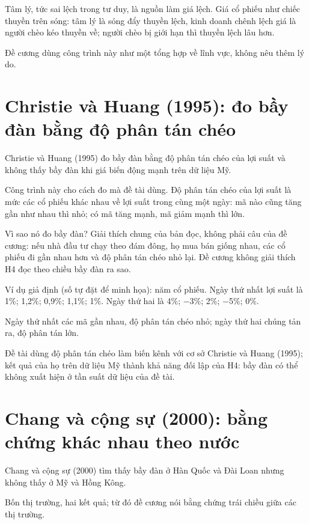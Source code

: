 Tâm lý, tức sai lệch trong tư duy, là nguồn làm giá lệch. Giá cổ phiếu như chiếc thuyền trên sóng: tâm lý là sóng đẩy thuyền lệch, kinh doanh chênh lệch giá là người chèo kéo thuyền về; người chèo bị giới hạn thì thuyền lệch lâu hơn.

Đề cương dùng công trình này như một tổng hợp về lĩnh vực, không nêu thêm lý do.

\section{Christie và Huang (1995): đo bầy đàn bằng độ phân tán chéo}

Christie và Huang (1995) đo bầy đàn bằng độ phân tán chéo của lợi suất và không thấy bầy đàn khi giá biến động mạnh trên dữ liệu Mỹ.

Công trình này cho cách đo mà đề tài dùng. Độ phân tán chéo của lợi suất là mức các cổ phiếu khác nhau về lợi suất trong cùng một ngày: mã nào cũng tăng gần như nhau thì nhỏ; có mã tăng mạnh, mã giảm mạnh thì lớn.

Vì sao nó đo bầy đàn? Giải thích chung của bản đọc, không phải câu của đề cương: nếu nhà đầu tư chạy theo đám đông, họ mua bán giống nhau, các cổ phiếu đi gần nhau hơn và độ phân tán chéo nhỏ lại. Đề cương không giải thích H4 đọc theo chiều bầy đàn ra sao.

\begin{tcolorbox}[breakable]
Ví dụ giả định (số tự đặt để minh họa): năm cổ phiếu. Ngày thứ nhất lợi suất là 1\%; 1,2\%; 0,9\%; 1,1\%; 1\%. Ngày thứ hai là 4\%; −3\%; 2\%; −5\%; 0\%.

Ngày thứ nhất các mã gần nhau, độ phân tán chéo nhỏ; ngày thứ hai chúng tản ra, độ phân tán lớn.
\end{tcolorbox}

Đề tài dùng độ phân tán chéo làm biến kênh với cơ sở Christie và Huang (1995); kết quả của họ trên dữ liệu Mỹ thành khả năng đối lập của H4: bầy đàn có thể không xuất hiện ở tần suất dữ liệu của đề tài.

\section{Chang và cộng sự (2000): bằng chứng khác nhau theo nước}

Chang và cộng sự (2000) tìm thấy bầy đàn ở Hàn Quốc và Đài Loan nhưng không thấy ở Mỹ và Hồng Kông.

Bốn thị trường, hai kết quả; từ đó đề cương nói bằng chứng trái chiều giữa các thị trường.

